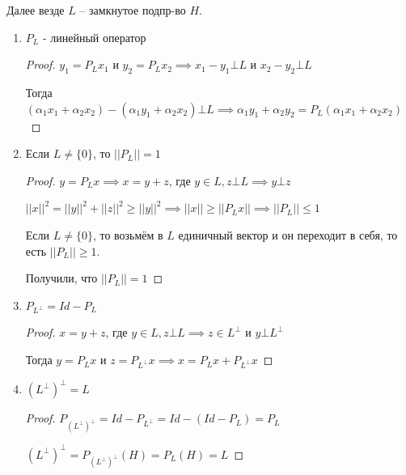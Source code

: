 \begin{properties}

    Далее везде $L$ -- замкнутое подпр-во $H$.

    \begin{enumerate}
        \item { $P_L$ - линейный оператор
            \begin{proof}
                $y_1 = P_L x_1$ и $y_2 = P_L x_2 \implies x_1 - y_1 \bot L$ и $x_2 - y_2 \bot L$

                Тогда $(\alpha_1 x_1 + \alpha_2 x_2) - (\alpha_1 y_1 + \alpha_2 x_2) \bot L \implies \alpha_1 y_1 + \alpha_2 y_2 = P_L (\alpha_1 x_1 + \alpha_2 x_2)$
            \end{proof}
        }
        \item {
            Если $L \neq \{ 0 \}$, то $||P_L|| = 1$

            \begin{proof}
                $y = P_L x \implies x = y + z$, где $y \in L, z \bot L \implies y \bot z$

                $||x||^2 = ||y||^2 + ||z||^2 \geqslant ||y||^2 \implies ||x|| \geqslant ||P_L x|| \implies ||P_L|| \leqslant 1$

                Если $L \neq \{ 0 \}$, то возьмём в $L$ единичный вектор и он переходит в себя, то есть $|| P_L || \geq 1$.

                Получили, что $|| P_L || = 1$
            \end{proof}
        }
        \item {
            $P_{L^\bot} = Id - P_L$

            \begin{proof}
                $x = y + z$, где $y \in L, z \bot L \implies z \in L^\bot$ и $y \bot L^\bot$

                Тогда $y = P_L x$ и $z = P_{L^\bot} x \implies x = P_{L} x + P_{L^\bot} x$
            \end{proof}
        }
        \item {
            $(L^\bot)^\bot = L$

            \begin{proof}
                $P_{(L^\bot)^\bot} = Id - P_{L^\bot} = Id - (Id - P_L) = P_L$

                $(L^\bot)^\bot = P_{(L^\bot)^\bot} (H) = P_L (H) = L$
            \end{proof}
        }
    \end{enumerate}
\end{properties}

